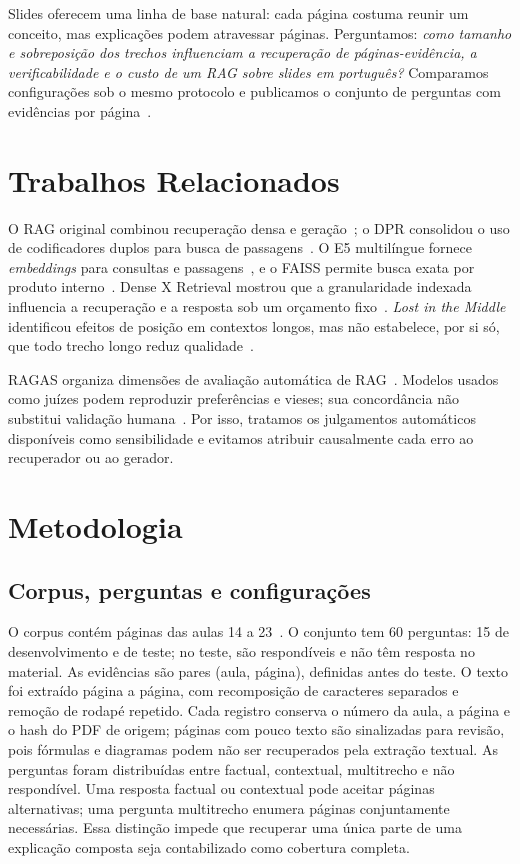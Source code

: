 \documentclass[conference]{IEEEtran}
\begin{document}
Slides oferecem uma linha de base natural: cada página costuma reunir um conceito, mas explicações podem atravessar páginas.
Perguntamos: \textit{como tamanho e sobreposição dos trechos influenciam a recuperação de páginas-evidência, a verificabilidade e o custo de um RAG sobre slides em português?}
Comparamos \NConfiguracoes{} configurações sob o mesmo protocolo e publicamos o conjunto de perguntas com evidências por página~\cite{evangelista2026ragdataset}.

\section{Trabalhos Relacionados}
O RAG original combinou recuperação densa e geração~\cite{lewis2020rag}; o DPR consolidou o uso de codificadores duplos para busca de passagens~\cite{karpukhin2020dense}.
O E5 multilíngue fornece \textit{embeddings} para consultas e passagens~\cite{wang2024multilingual,e5modelcard}, e o FAISS permite busca exata por produto interno~\cite{johnson2021billion}.
Dense X Retrieval mostrou que a granularidade indexada influencia a recuperação e a resposta sob um orçamento fixo~\cite{chen2024dense}.
\textit{Lost in the Middle} identificou efeitos de posição em contextos longos, mas não estabelece, por si só, que todo trecho longo reduz qualidade~\cite{liu2024lost}.

RAGAS organiza dimensões de avaliação automática de RAG~\cite{es2024ragas}.
Modelos usados como juízes podem reproduzir preferências e vieses; sua concordância não substitui validação humana~\cite{zheng2023judging,panickssery2024llm}.
Por isso, tratamos os julgamentos automáticos disponíveis como sensibilidade e evitamos atribuir causalmente cada erro ao recuperador ou ao gerador.

\section{Metodologia}
\subsection{Corpus, perguntas e configurações}
O corpus contém \NPaginasCorpus{} páginas das aulas 14 a 23~\cite{soares2026aulas}.
O conjunto tem 60 perguntas: 15 de desenvolvimento e \NPerguntasTeste{} de teste; no teste, \NRespondiveisTeste{} são respondíveis e \NNaoRespondiveisTeste{} não têm resposta no material.
As evidências são pares (aula, página), definidas antes do teste.
O texto foi extraído página a página, com recomposição de caracteres separados e remoção de rodapé repetido.
Cada registro conserva o número da aula, a página e o hash do PDF de origem; páginas com pouco texto são sinalizadas para revisão, pois fórmulas e diagramas podem não ser recuperados pela extração textual.
As perguntas foram distribuídas entre factual, contextual, multitrecho e não respondível.
Uma resposta factual ou contextual pode aceitar páginas alternativas; uma pergunta multitrecho enumera páginas conjuntamente necessárias.
Essa distinção impede que recuperar uma única parte de uma explicação composta seja contabilizado como cobertura completa.
\end{document}
